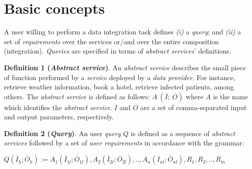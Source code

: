 \section{Basic concepts}

A user willing to perform a data integration task defines \textit{(i)} a \textsl{query}; and \textit{(ii)} a set of  \textsl{requirements} over the services or/and over the entire composition (integration). \textsl{Queries} are specified in terms of \textsl{abstract services}' definitions.

\bigskip
\noindent \textbf{Definition 1 (\textsl{Abstract service})}. An \textsl{abstract service} describes the small piece of function performed by a \textsl{service} deployed by a \textsl{data provider}. For instance, retrieve weather information, book a hotel, retrieve infected patients, among others. The \textsl{abstract service} is defined as follows: $A \ (\overline{I}; \ \overline{O})$ where $A$ is the name which identifies the \textsl{abstract service}. $\overline{I}$ and $\overline{O}$ are a set of comma-separated input and output parameters, respectively.

\bigskip
\noindent \textbf{Definition 2 (\textsl{Query})}.
An user \textsl{query} $Q$ is defined as a sequence of \textsl{abstract services} followed by a set of \textsl{user requirements} in accordance with the grammar:
%
\begin{center}
\begin{math}
Q (\overline{I}_{h}; \overline{O}_{h}) := A_{1}(\overline{I}_{1l};
\overline{O}_{1l}), A_{2}(\overline{I}_{2l}; \overline{O}_{2l}), ..,  A_{n}(\overline{I}_{nl}; \overline{O}_{nl}),R_{1},R_{2}, .., R_{m}
\end{math}
\end{center}
%

